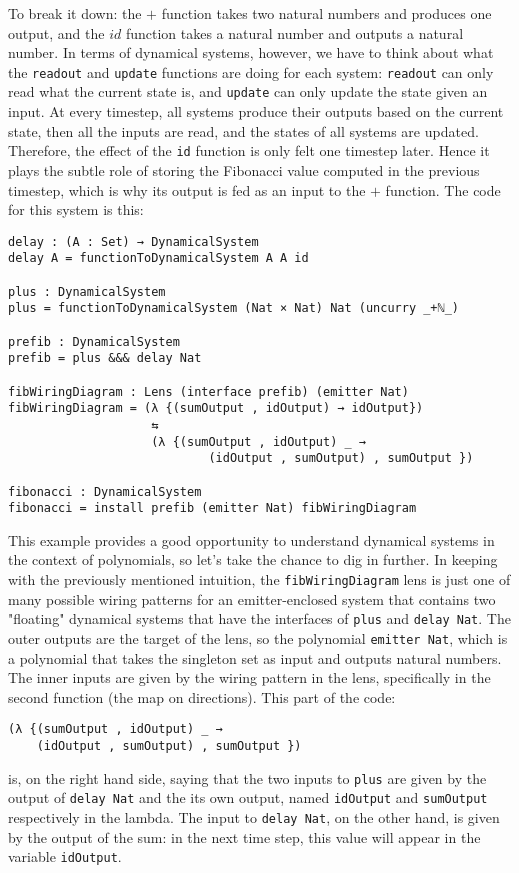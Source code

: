 To break it down: the $+$ function takes two natural numbers and produces one output, and the $id$ function takes a natural number and outputs a natural number. In terms of dynamical systems, however, we have to think about what the \texttt{readout} and \texttt{update} functions are doing for each system: \texttt{readout} can only read what the current state is, and \texttt{update} can only update the state given an input. At every timestep, all systems produce their outputs based on the current state, then all the inputs are read, and the states of all systems are updated. Therefore, the effect of the \texttt{id} function is only felt one timestep later. Hence it plays the subtle role of storing the Fibonacci value computed in the previous timestep, which is why its output is fed as an input to the $+$ function. The code for this system is this:

\begin{verbatim}
delay : (A : Set) → DynamicalSystem
delay A = functionToDynamicalSystem A A id

plus : DynamicalSystem
plus = functionToDynamicalSystem (Nat × Nat) Nat (uncurry _+ℕ_)

prefib : DynamicalSystem
prefib = plus &&& delay Nat

fibWiringDiagram : Lens (interface prefib) (emitter Nat)
fibWiringDiagram = (λ {(sumOutput , idOutput) → idOutput})
                    ⇆ 
                    (λ {(sumOutput , idOutput) _ → 
                            (idOutput , sumOutput) , sumOutput })

fibonacci : DynamicalSystem
fibonacci = install prefib (emitter Nat) fibWiringDiagram
\end{verbatim}

This example provides a good opportunity to understand dynamical systems in the context of polynomials, so let's take the chance to dig in further. In keeping with the previously mentioned intuition, the \texttt{fibWiringDiagram} lens is just one of many possible wiring patterns for an emitter-enclosed system that contains two "floating" dynamical systems that have the interfaces of \texttt{plus} and \texttt{delay Nat}. The outer outputs are the target of the lens, so the polynomial \texttt{emitter Nat}, which is a polynomial that takes the singleton set as input and outputs natural numbers. The inner inputs are given by the wiring pattern in the lens, specifically in the second function (the map on directions). This part of the code:
\begin{verbatim}
(λ {(sumOutput , idOutput) _ → 
    (idOutput , sumOutput) , sumOutput })
\end{verbatim}
is, on the right hand side, saying that the two inputs to \texttt{plus} are given by the output of \texttt{delay Nat} and the its own output, named \texttt{idOutput} and \texttt{sumOutput} respectively in the lambda. The input to \texttt{delay Nat}, on the other hand, is given by the output of the sum: in the next time step, this value will appear in the variable \texttt{idOutput}.

